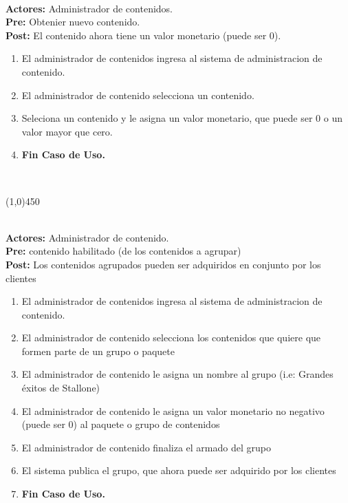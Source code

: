 \documentclass[11pt, a4paper, spanish]{article}
\begin{document}
{	 \\
\textbf{Actores:} Administrador de contenidos. \\
\textbf{Pre:} Obtenier nuevo contenido. \\
\textbf{Post:} El contenido ahora tiene un valor monetario (puede ser 0).\\
\begin{enumerate}
	\item El administrador de contenidos ingresa al sistema de administracion de contenido.
	\item El administrador de contenido selecciona un contenido.
	\item Seleciona un contenido y le asigna un valor monetario, que puede ser 0 o un valor mayor que cero.
\item \textbf{Fin Caso de Uso.} \\

\end{enumerate}
 \\
\begin{center} \line(1,0){450} \end{center}



	 \\
\textbf{Actores:} Administrador de contenido. \\
\textbf{Pre:} contenido habilitado (de los contenidos a agrupar) \\
\textbf{Post:} Los contenidos agrupados pueden ser adquiridos en conjunto por los clientes\\
\begin{enumerate}
	\item El administrador de contenidos ingresa al sistema de administracion de contenido.
	\item El administrador de contenido selecciona los contenidos que quiere que formen parte de un grupo o paquete
    \item El administrador de contenido le asigna un nombre al grupo (i.e: Grandes éxitos de Stallone)
	\item El administrador de contenido le asigna un valor monetario no negativo (puede ser 0) al paquete o grupo de contenidos
	\item El administrador de contenido finaliza el armado del grupo
	\item El sistema publica el grupo, que ahora puede ser adquirido por los clientes
\item \textbf{Fin Caso de Uso.} \\


\end{enumerate}}
\end{document}
